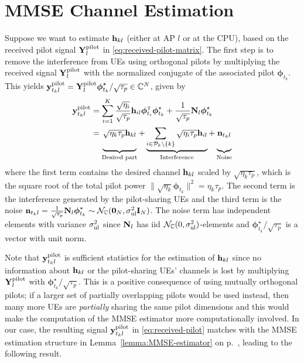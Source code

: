 \section{MMSE Channel Estimation}\label{sec:MMSE-channel-estimation}
Suppose we want to estimate $\mathbf{h}_{kl}$ (either at AP $l$ or at the CPU), based on the received pilot signal $\mathbf{Y}_{l}^{{\rm pilot}}$ in \eqref{eq:received-pilot-matrix}. The first step is to remove the interference from UEs using orthogonal pilots by multiplying the received signal $\mathbf{Y}_{l}^{{\rm pilot}}$ with the normalized conjugate of the associated pilot $\boldsymbol{\phi}_{t_k}$. This yields $\mathbf{y}_{t_kl}^{{\rm pilot}} =\mathbf{Y}_{l}^{{\rm pilot}}  \boldsymbol{\phi}_{t_k}^{\star}/{\sqrt{\tau_p}} \in \mathbb{C}^N$, given by
\begin{align} \notag
\vect{y}_{t_kl}^{{\rm pilot}} & = 
\sum_{i=1}^{K}  \frac{\sqrt{\eta_i }}{\sqrt{\tau_p}}\vect{h}_{il} \boldsymbol{\phi}_{t_i}^{\Ttran}  \boldsymbol{\phi}_{t_k}^{\star}+ \frac{1}{\sqrt{\tau_p}} \vect{N}_{l}  \boldsymbol{\phi}_{t_k}^{\star}  \\
& = \underbrace{ \vphantom{\sum_{i \in \mathcal{P}_k\setminus \{k \}}} \sqrt{\eta_k \tau_p } \vect{h}_{kl}}_{\text{Desired part}} + \underbrace{\sum_{i \in \mathcal{P}_k\setminus \{k \}} \sqrt{\eta_i \tau_p } \vect{h}_{il}}_{\text{Interference}} + \underbrace{\vphantom{\sum_{i \in \mathcal{P}_k\setminus \{k \}}} \vect{n}_{t_k l}}_{\text{Noise}}
\label{eq:received-pilot}
\end{align}
where the first term contains the desired channel $ \mathbf{h}_{kl}$ scaled by $\sqrt{\eta_k \tau_p }$, which is the square root of the total pilot power $\| \sqrt{\eta_k}\boldsymbol{\phi}_{t_k} \|^2 = \eta_k \tau_p$. The second term is the interference generated by the pilot-sharing UEs and the third term is the noise
$\mathbf{n}_{t_k l} =  \frac{1}{\sqrt{\tau_p}} \mathbf{N}_{l}  \boldsymbol{\phi}_{t_k}^{\star} \sim \mathcal{N}_{\mathbb{C}} (\mathbf{0}_N, \sigma^2_{\mathrm{ul}} \mathbf{I}_N)$. The noise term has independent elements with variance $\sigma^2_{\mathrm{ul}}$ since $\mathbf{N}_l$ has \gls{iid} $ \mathcal{N}_{\mathbb{C}} (0, \sigma^2_{\mathrm{ul}} )$-elements  and $\boldsymbol{\phi}_{t_k}^{\star}/ \sqrt{\tau_p}$ is a vector with unit norm. 

Note that $\mathbf{y}_{t_kl}^{{\rm pilot}}$ is sufficient statistics for the estimation of $\mathbf{h}_{kl}$ since no information  about $\mathbf{h}_{kl}$  or the pilot-sharing UEs' channels is lost  by multiplying $\mathbf{Y}_{l}^{{\rm pilot}}$ with $\boldsymbol{\phi}_{t_k}^{\star}/{\sqrt{\tau_p}}$. This is a positive consequence of using mutually orthogonal pilots; if a larger set of partially overlapping pilots would be used instead, then many more UEs are \emph{partially} sharing the same pilot dimensions and this would make the computation of the MMSE estimator more computationally involved.
In our case, the resulting signal $\mathbf{y}_{t_kl}^{{\rm pilot}}$ in \eqref{eq:received-pilot} matches with the MMSE estimation structure in Lemma~\ref{lemma:MMSE-estimator} on p.~\pageref{lemma:MMSE-estimator}, leading to the following result.

